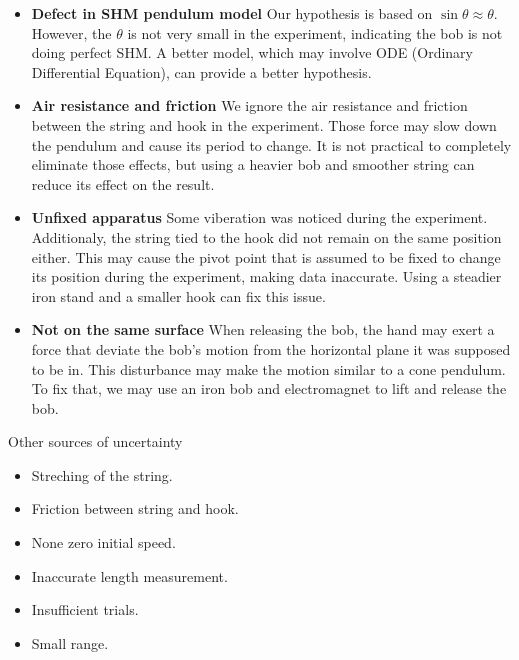 \documentclass[a4paper]{article}
\begin{document}
\begin{itemize}
    \item \textbf{Defect in SHM pendulum model} Our hypothesis is based on $\sin\theta\approx\theta$. However, the $\theta$ is not very small in the experiment, indicating the bob is not doing perfect SHM. A better model, which may involve ODE (Ordinary Differential Equation), can provide a better hypothesis.
    \item \textbf{Air resistance and friction} We ignore the air resistance and friction between the string and hook in the experiment. Those force may slow down the pendulum and cause its period to change. It is not practical to completely eliminate those effects, but using a heavier bob and smoother string can reduce its effect on the result. 
    \item \textbf{Unfixed apparatus} Some viberation was noticed during the experiment. Additionaly, the string tied to the hook did not remain on the same position either. This may cause the pivot point that is assumed to be fixed to change its position during the experiment, making data inaccurate. Using a steadier iron stand and a smaller hook can fix this issue. 
    \item \textbf{Not on the same surface} When releasing the bob, the hand may exert a force that deviate the bob's motion from the horizontal plane it was supposed to be in. This disturbance may make the motion similar to a cone pendulum. To fix that, we may use an iron bob and electromagnet to lift and release the bob.
\end{itemize}

\begin{tcolorbox}[title = Note]
    Other sources of uncertainty
    \begin{itemize}
        \item Streching of the string.
        \item Friction between string and hook.
        \item None zero initial speed.
        \item Inaccurate length measurement.
        \item Insufficient trials.
        \item Small range. 
    \end{itemize}
\end{tcolorbox}

\clearpage


\end{document}
